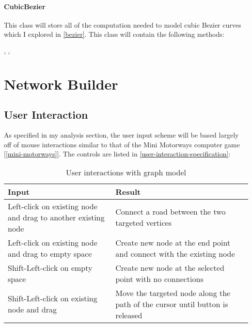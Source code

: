         \paragraph{CubicBezier}

        This class will store all of the computation needed to model cubic Bezier curves which I explored in \autoref{bezier}.
        This class will contain the following methods:

        , , 

\section{Network Builder}

    \subsection{User Interaction}

    As specified in my analysis section, the user input scheme will be based largely off of mouse interactions similar to that of the Mini Motorways computer game [\autoref{mini-motorways}]. The controls are listed in \autoref{user-interaction-specification}:

    \begin{table}[ht]
        \centering
        \begin{tabular}{|p{}|p{}|}
            \hline
            \textbf{Input} & \textbf{Result}\\
            \hline
            Left-click on existing node and drag to another existing node & Connect a road between the two targeted vertices\\\hline
            Left-click on existing node and drag to empty space & Create new node at the end point and connect with the existing node\\\hline
            Shift-Left-click on empty space & Create new node at the selected point with no connections\\\hline
            Shift-Left-click on existing node and drag & Move the targeted node along the path of the cursor until button is released\\\hline
        \end{tabular}
        \caption{User interactions with graph model}
        \label{user-interaction-specification}
    \end{table}


